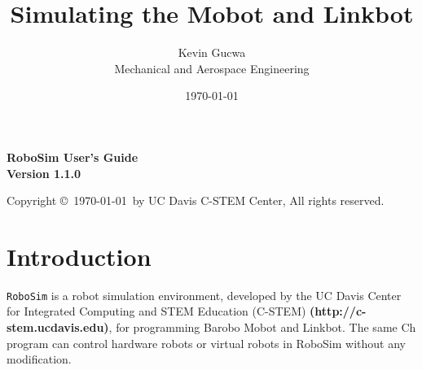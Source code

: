 \documentclass{article}
\title{Simulating the Mobot and Linkbot}
\author{Kevin Gucwa\\Mechanical and Aerospace Engineering}
\date{\today}
\begin{document}
\begin{center}
{\Huge\sf\bf RoboSim User's Guide}\\
\vspace*{2.5cm}
{\Large\bf Version 1.1.0}
\vspace{4in}

Copyright \copyright\ \today\ by UC Davis C-STEM Center, All rights reserved.

\end{center}

\newpage
\tableofcontents
\newpage

\section{Introduction}
\texttt{RoboSim} is a robot simulation environment, developed by the UC Davis
Center for Integrated Computing and STEM Education (C-STEM) {\color{blue} \bf
(http://c-stem.ucdavis.edu)}, for programming Barobo Mobot and Linkbot.  The
same Ch program  can control hardware robots or virtual robots in RoboSim
without any modification.
\end{document}
